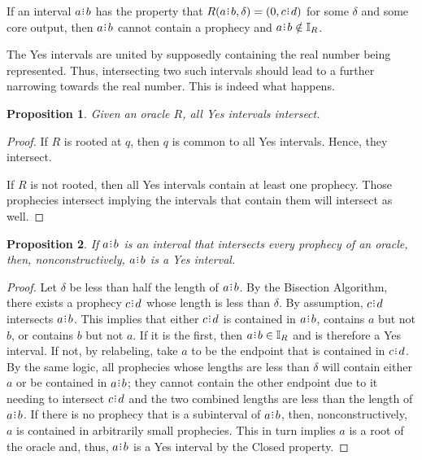 \documentclass[12pt]{article}
\newtheorem{proposition}{Proposition}[section]
\begin{document}
If an interval $a\rint b$ has the property that $R(a\rint b, \delta) = (0, c\rint d)$ for some $\delta$ and some core output, then $a\rint b$ cannot contain a prophecy and $a\rint b \notin \mathbb{I}_R$. 

The Yes intervals are united by supposedly containing the real number being represented. Thus, intersecting two such intervals should lead to a further narrowing towards the real number. This is indeed what happens. 

\begin{proposition}\label{os-yesinter}
    Given an oracle $R$, all Yes intervals intersect. 
\end{proposition}

\begin{proof}
    If $R$ is rooted at $q$, then $q$ is common to all Yes intervals. Hence, they intersect. 

    If $R$ is not rooted, then all Yes intervals contain at least one prophecy. Those prophecies intersect implying the intervals that contain them will intersect as well. 
\end{proof}


\begin{proposition}\label{os-inter}
    If $a\rint b$ is an interval that intersects every prophecy of an oracle, then, nonconstructively, $a\rint b$ is a Yes interval. 
\end{proposition}

\begin{proof}
    Let $\delta$ be less than half the length of $a\rint b$. By the Bisection Algorithm, there exists a prophecy $c\rint d$ whose length is less than $\delta$. By assumption, $c\rint d$ intersects $a\rint b$. This implies that either $c\rint d$ is contained in $a\rint b$, contains $a$ but not $b$, or contains $b$ but not $a$. If it is the first, then $a\rint b \in \mathbb{I}_R$ and is therefore a Yes interval. If not, by relabeling, take $a$ to be the endpoint that is contained in $c\rint d$. By the same logic, all prophecies whose lengths are less than $\delta$ will contain either $a$ or be contained in $a\rint b$; they cannot contain the other endpoint due to it needing to intersect $c\rint d$ and the two combined lengths are less than the length of $a\rint b$. If there is no prophecy that is a subinterval of $a\rint b$, then, nonconstructively, $a$ is contained in arbitrarily small prophecies. This in turn implies $a$ is a root of the oracle and, thus, $a\rint b$ is a Yes interval by the Closed property. 
\end{proof}
\end{document}
